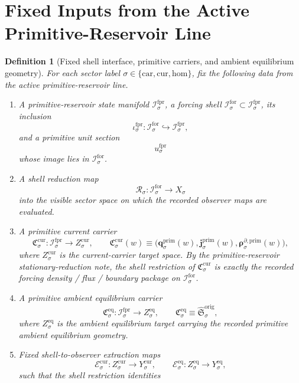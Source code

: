 \documentclass[11pt]{article}
\newcommand{\Car}{\mathrm{car}}
\newcommand{\Cur}{\mathrm{cur}}
\newcommand{\Hom}{\mathrm{hom}}
\newcommand{\ForPrimSpace}[1]{\mathcal I_{#1}^{\mathrm{fpr}}}
\newcommand{\ForSpace}[1]{\mathcal I_{#1}^{\mathrm{for}}}
\newcommand{\ForPrimInc}[1]{\iota_{#1}^{\mathrm{fpr}}}
\newcommand{\ForPrimUnit}[1]{u_{#1}^{\mathrm{fpr}}}
\newcommand{\ForPrimDensitySource}[1]{\boldsymbol{q}_{#1}^{\mathrm{prim}}}
\newcommand{\ForPrimFluxSource}[1]{\boldsymbol{j}_{#1}^{\mathrm{prim}}}
\newcommand{\ForPrimBoundarySource}[1]{\boldsymbol{\rho}_{#1}^{\partial,\mathrm{prim}}}
\newcommand{\ForPrimLiftedAmbient}[1]{\widehat{\mathfrak S}_{#1}^{\mathrm{orig}}}
\newcommand{\Reduction}[1]{\mathcal R_{#1}}
\newcommand{\CurrentCarrier}[1]{\mathfrak C_{#1}^{\mathrm{cur}}}
\newcommand{\EqCarrier}[1]{\mathfrak C_{#1}^{\mathrm{eq}}}
\newcommand{\CurrentExtract}[1]{\mathscr E_{#1}^{\mathrm{cur}}}
\newcommand{\EqExtract}[1]{\mathscr E_{#1}^{\mathrm{eq}}}
\newtheorem{definition}{Definition}
\begin{document}
\section{Fixed Inputs from the Active Primitive-Reservoir Line}

\begin{definition}[Fixed shell interface, primitive carriers, and ambient equilibrium geometry]
\label{def:fixed}
For each sector label \(\sigma\in\{\Car,\Cur,\Hom\}\), fix the following data from the active primitive-reservoir line.
\begin{enumerate}
    \item A primitive-reservoir state manifold \(\ForPrimSpace{\sigma}\), a forcing shell \(\ForSpace{\sigma}\subset\ForPrimSpace{\sigma}\), its inclusion
    \[
    \ForPrimInc{\sigma}:\ForSpace{\sigma}\hookrightarrow \ForPrimSpace{\sigma},
    \]
    and a primitive unit section
    \[
    \ForPrimUnit{\sigma}
    \]
    whose image lies in \(\ForSpace{\sigma}\).
    \item A shell reduction map
    \[
    \Reduction{\sigma}:\ForSpace{\sigma}\to X_{\sigma}
    \]
    into the visible sector space on which the recorded observer maps are evaluated.
    \item A primitive current carrier
    \[
    \CurrentCarrier{\sigma}:\ForPrimSpace{\sigma}\to Z_{\sigma}^{\mathrm{cur}},
    \qquad
    \CurrentCarrier{\sigma}(w)
    \equiv
    \bigl(
    \ForPrimDensitySource{\sigma}(w),
    \ForPrimFluxSource{\sigma}(w),
    \ForPrimBoundarySource{\sigma}(w)
    \bigr),
    \]
    where \(Z_{\sigma}^{\mathrm{cur}}\) is the current-carrier target space. By the primitive-reservoir stationary-reduction note, the shell restriction of \(\CurrentCarrier{\sigma}\) is exactly the recorded forcing density / flux / boundary package on \(\ForSpace{\sigma}\).
    \item A primitive ambient equilibrium carrier
    \[
    \EqCarrier{\sigma}:\ForPrimSpace{\sigma}\to Z_{\sigma}^{\mathrm{eq}},
    \qquad
    \EqCarrier{\sigma}\equiv \ForPrimLiftedAmbient{\sigma},
    \]
    where \(Z_{\sigma}^{\mathrm{eq}}\) is the ambient equilibrium target carrying the recorded primitive ambient equilibrium geometry.
    \item Fixed shell-to-observer extraction maps
    \[
    \CurrentExtract{\sigma}:Z_{\sigma}^{\mathrm{cur}}\to Y_{\sigma}^{\mathrm{cur}},
    \qquad
    \EqExtract{\sigma}:Z_{\sigma}^{\mathrm{eq}}\to Y_{\sigma}^{\mathrm{eq}},
    \]
    such that the shell restriction identities
    \begin{equation}

\end{equation}
\end{enumerate}
\end{definition}
\end{document}
